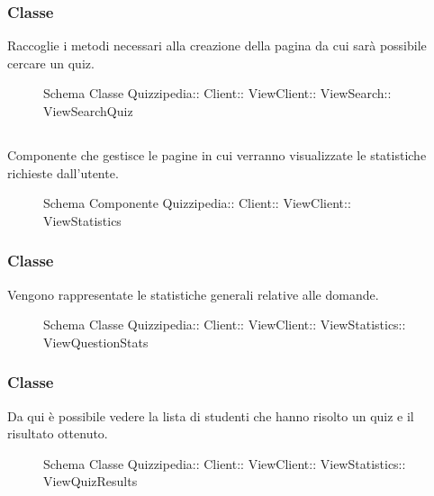 \subsubsection{Classe }
Raccoglie i metodi necessari alla creazione della pagina da cui sarà possibile cercare un quiz.
\begin{figure}[H]
\centering
\noindent{}
\caption[Schema Classe ViewSearchQuiz]{Schema Classe Quizzipedia:: Client:: ViewClient:: ViewSearch:: ViewSearchQuiz}
\end{figure}
\subsection{}
Componente che gestisce le pagine in cui verranno visualizzate le statistiche richieste dall'utente.
\begin{figure}[H]
\centering
\noindent{}
\caption[Schema Componente Quizzipedia::Client::ViewClient::ViewStatistics]{Schema Componente Quizzipedia:: Client:: ViewClient:: ViewStatistics}
\end{figure}
\subsubsection{Classe }
Vengono rappresentate le statistiche generali relative alle domande.
\begin{figure}[H]
\centering
\noindent{}
\caption[Schema Classe ViewQuestionStats]{Schema Classe Quizzipedia:: Client:: ViewClient:: ViewStatistics:: ViewQuestionStats}
\end{figure}
\subsubsection{Classe }
Da qui è possibile vedere la lista di studenti che hanno risolto un quiz e il risultato ottenuto.
\begin{figure}[H]
\centering
\noindent{}
\caption[Schema Classe ViewQuizResults]{Schema Classe Quizzipedia:: Client:: ViewClient:: ViewStatistics:: ViewQuizResults}
\end{figure}
